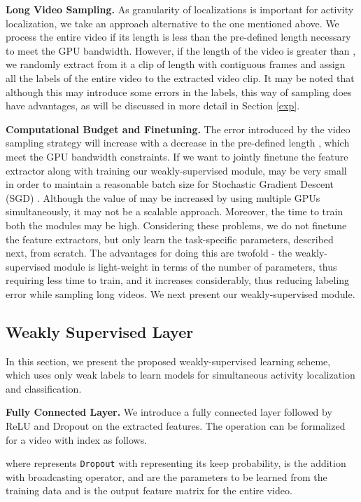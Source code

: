 \documentclass[runningheads]{llncs}
\begin{document}
\textbf{Long Video Sampling.} As granularity of localizations is important for activity localization, we take an approach alternative to the one mentioned above. We process the entire video if its length is less than the pre-defined length  necessary to meet the GPU bandwidth. However, if the length of the video is greater than , we randomly extract from it a clip of length  with contiguous frames and assign all the labels of the entire video to the extracted video clip. It may be noted that although this may introduce some errors in the labels, this way of sampling does have advantages, as will be discussed in more detail in Section \ref{exp}. 

\textbf{Computational Budget and Finetuning.} The error introduced by the video sampling strategy will increase with a decrease in the pre-defined length , which meet the GPU bandwidth constraints. If we want to jointly finetune the feature extractor along with training our weakly-supervised module,  may be very small in order to maintain a reasonable batch size for Stochastic Gradient Descent (SGD) \cite{bottou2010large}. Although the value of  may be increased by using multiple GPUs simultaneously, it may not be a scalable approach. Moreover, the time to train both the modules may be high. Considering these problems, we do not finetune the feature extractors, but only learn the task-specific parameters, described next, from scratch. The advantages for doing this are twofold - the weakly-supervised module is light-weight in terms of the number of parameters, thus requiring less time to train, and it increases  considerably, thus reducing labeling error while sampling long videos. We next present our weakly-supervised module.

\subsection{Weakly Supervised Layer}

In this section, we present the proposed weakly-supervised learning scheme, which uses only weak labels to learn models for simultaneous activity localization and classification. 

\textbf{Fully Connected Layer.} We introduce a fully connected layer followed by ReLU \cite{nair2010rectified} and Dropout \cite{srivastava2014dropout} on the extracted features. The operation can be formalized for a video with index  as follows.


where  represents \texttt{Dropout} with  representing its keep probability,  is the addition with broadcasting operator,   and  are the parameters to be learned from the training data and  is the output feature matrix for the entire video.
\end{document}

